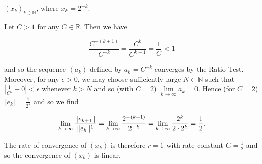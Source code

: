 $(x_k)_{k \in \mathbb{N}}$, where $x_k = 2^{-k}$.

\begin{solution}
  Let $C > 1$ for any $C \in \mathbb{R}$. Then we have

  $$
  \frac{C^{-(k+1)}}{C^{-k}} = \frac{C^k}{C^{k+1}} = \frac{1}{C} < 1
  $$

  and so the sequence $(a_k)$ defined by $a_k = C^{-k}$ converges by the Ratio Test. Moreover, for any $\epsilon > 0$,
  we may choose sufficiently large $N \in \mathbb{N}$ such that $\left|\frac{1}{C^{k}} - 0 \right| < \epsilon$ whenever 
  $k > N$ and so (with $C = 2$) $\lim\limits_{k \to \infty} a_k = 0$. Hence (for $C = 2$) 
  $\Vert e_{k} \Vert = \frac{1}{2^k}$ and so we find

  $$
    \lim\limits_{k \to \infty} \frac{\Vert e_{k+1} \Vert}{\Vert e_k \Vert^1} 
        = \lim\limits_{k \to \infty} \frac{2^{-(k+1)}}{2^{-k}} \\
        = \lim\limits_{k \to \infty} \frac{2^k}{2 \cdot 2^k} \\
        = \frac{1}{2}.
  $$

  The rate of convergence of $(x_k)$ is therefore $r = 1$ with rate constant $C = \frac{1}{2}$ and so the convergence
  of $(x_k)$ is linear.
  \ \\
\end{solution}